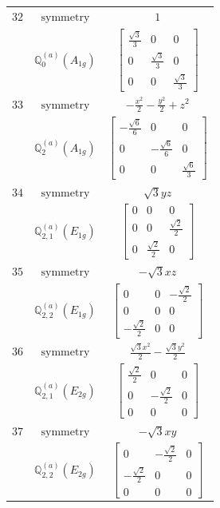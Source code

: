 \documentclass[fleqn,8pt,landscape]{jsarticle}
\begin{document}
\begin{longtable}{ccc}
$ 32 $ & $ \text{symmetry} $ & $ 1 $ \\
$  $ & $ \mathbb{Q}_{0}^{(a)}(A_{1g}) $ & $ \begin{bmatrix} \frac{\sqrt{3}}{3} & 0 & 0 \\ 0 & \frac{\sqrt{3}}{3} & 0 \\ 0 & 0 & \frac{\sqrt{3}}{3} \end{bmatrix} $ \\ \hline
$ 33 $ & $ \text{symmetry} $ & $ - \frac{x^{2}}{2} - \frac{y^{2}}{2} + z^{2} $ \\
$  $ & $ \mathbb{Q}_{2}^{(a)}(A_{1g}) $ & $ \begin{bmatrix} - \frac{\sqrt{6}}{6} & 0 & 0 \\ 0 & - \frac{\sqrt{6}}{6} & 0 \\ 0 & 0 & \frac{\sqrt{6}}{3} \end{bmatrix} $ \\ \hline
$ 34 $ & $ \text{symmetry} $ & $ \sqrt{3} y z $ \\
$  $ & $ \mathbb{Q}_{2,1}^{(a)}(E_{1g}) $ & $ \begin{bmatrix} 0 & 0 & 0 \\ 0 & 0 & \frac{\sqrt{2}}{2} \\ 0 & \frac{\sqrt{2}}{2} & 0 \end{bmatrix} $ \\ \hline
$ 35 $ & $ \text{symmetry} $ & $ - \sqrt{3} x z $ \\
$  $ & $ \mathbb{Q}_{2,2}^{(a)}(E_{1g}) $ & $ \begin{bmatrix} 0 & 0 & - \frac{\sqrt{2}}{2} \\ 0 & 0 & 0 \\ - \frac{\sqrt{2}}{2} & 0 & 0 \end{bmatrix} $ \\ \hline
$ 36 $ & $ \text{symmetry} $ & $ \frac{\sqrt{3} x^{2}}{2} - \frac{\sqrt{3} y^{2}}{2} $ \\
$  $ & $ \mathbb{Q}_{2,1}^{(a)}(E_{2g}) $ & $ \begin{bmatrix} \frac{\sqrt{2}}{2} & 0 & 0 \\ 0 & - \frac{\sqrt{2}}{2} & 0 \\ 0 & 0 & 0 \end{bmatrix} $ \\ \hline
$ 37 $ & $ \text{symmetry} $ & $ - \sqrt{3} x y $ \\
$  $ & $ \mathbb{Q}_{2,2}^{(a)}(E_{2g}) $ & $ \begin{bmatrix} 0 & - \frac{\sqrt{2}}{2} & 0 \\ - \frac{\sqrt{2}}{2} & 0 & 0 \\ 0 & 0 & 0 \end{bmatrix} $ \\ \hline

\end{longtable}
\end{document}
